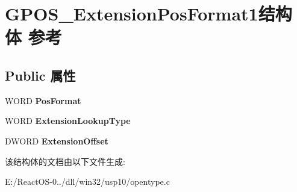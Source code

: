 \hypertarget{struct_g_p_o_s___extension_pos_format1}{}\section{G\+P\+O\+S\+\_\+\+Extension\+Pos\+Format1结构体 参考}
\label{struct_g_p_o_s___extension_pos_format1}
\subsection*{Public 属性}
\begin{DoxyCompactItemize}
\item 
\mbox{\label{struct_g_p_o_s___extension_pos_format1_a1fb90df88d10a03740a61b200c0abf68}} 
W\+O\+RD {\bfseries Pos\+Format}
\item 
\mbox{\label{struct_g_p_o_s___extension_pos_format1_a8f9dda5e58716b325ad0d567e169fbe5}} 
W\+O\+RD {\bfseries Extension\+Lookup\+Type}
\item 
\mbox{\label{struct_g_p_o_s___extension_pos_format1_aea93b682e37c957d3d68dd215659ac6a}} 
D\+W\+O\+RD {\bfseries Extension\+Offset}
\end{DoxyCompactItemize}


该结构体的文档由以下文件生成\+:\begin{DoxyCompactItemize}
\item 
E\+:/\+React\+O\+S-\/0../dll/win32/usp10/opentype.\+c\end{DoxyCompactItemize}
